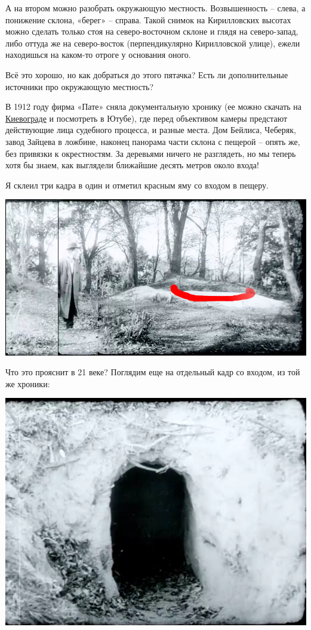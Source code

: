 А на втором можно разобрать окружающую местность. Возвышенность – слева, а понижение склона, «берег» – справа. Такой снимок на Кирилловских высотах можно сделать только стоя на северо-восточном склоне и глядя на северо-запад, либо оттуда же на северо-восток (перпендикулярно Кирилловской улице), ежели находишься на каком-то отроге у основания оного.

Всё это хорошо, но как добраться до этого пятачка? Есть ли дополнительные источники про окружающую местность?

В 1912 году фирма «Пате» сняла документальную хронику (ее можно скачать на \href{http://semiletov.org/kievograd/}{Киевограде} и посмотреть в Ютубе), где перед объективом камеры предстают действующие лица судебного процесса, и разные места. Дом Бейлиса, Чеберяк, завод Зайцева в ложбине, наконец панорама части склона с пещерой – опять же, без привязки к окрестностям. За деревьями ничего не разглядеть, но мы теперь хотя бы знаем, как выглядели ближайшие десять метров около входа!

Я склеил три кадра в один и отметил красным яму со входом в пещеру.

\begin{center}
\includegraphics[width=\linewidth]{chast-kirvys/beylis/pesh-comp.jpg}
\end{center}

Что это прояснит в 21 веке? Поглядим еще на отдельный кадр со входом, из той же хроники:

\begin{center}
\includegraphics[width=\linewidth]{chast-kirvys/beylis/vhod.jpg}
\end{center}

